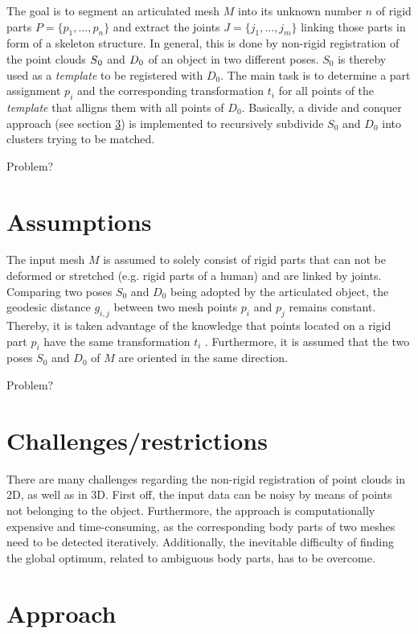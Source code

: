 \documentclass[notitlepage,english]{report}
\begin{document}
The goal is to segment an articulated mesh $M$ into its unknown number $n$ of rigid parts $ P =  \{ {p_1,\ldots,p_n}\}$ and extract the joints $ J =  \{ {j_1,...,j_m}\}$ linking those parts in form of a skeleton structure. In general, this is done by non-rigid registration of the point clouds $S\textsubscript{0}$ and $D\textsubscript{0}$ of an object in two different poses. $S_0$ is thereby used as a \textit{template} to be registered with $D_0$. The main task is to determine a part assignment $p_i$ and the corresponding transformation $t_i$ for all points of the \textit{template} that alligns them with all points of $D_0$. Basically, a divide and conquer approach (see section \ref{divideAndConquer}) is implemented to recursively subdivide $S_0$ and $D_0$ into clusters trying to be matched. 

Problem?

\section{Assumptions}

The input mesh $M$ is assumed to solely consist of rigid parts that can not be deformed or stretched (e.g. rigid parts of a human) and are linked by joints. Comparing two poses $S_0$ and $D_0$ being adopted by the articulated object, the geodesic distance $g_{i,j}$ between two mesh points $p_i$ and $p_j$ remains constant. Thereby, it is taken advantage of the knowledge that points located on a rigid part $p_i$ have the same transformation $t_i$ . Furthermore, it is assumed that the two poses $S_0$ and $D_0$ of $M$ are oriented in the same direction.

Problem?

\section{Challenges/restrictions}

There are many challenges regarding the non-rigid registration of point clouds in 2D, as well as in 3D. First off, the input data can be noisy by means of points not belonging to the object. Furthermore, the approach is computationally expensive and time-consuming, as the corresponding body parts of two meshes need to be detected iteratively. Additionally, the inevitable difficulty of finding the global optimum, related to ambiguous body parts, has to be overcome.

\section{Approach}
\label{divideAndConquer}
\end{document}
